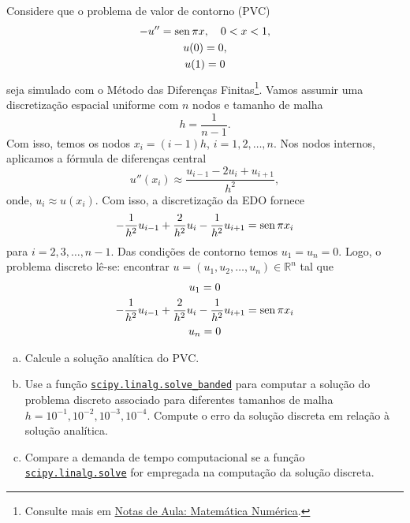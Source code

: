 \begin{exer}\label{exer:pvc1d}
  Considere que o problema de valor de contorno (PVC)
  \begin{gather}
    -u'' = \operatorname{sen} \pi x,\quad 0 < x < 1,\\
    u(0) = 0,\\
    u(1) = 0
  \end{gather}
  seja simulado com o Método das Diferenças Finitas\footnote{Consulte mais em \href{https://phkonzen.github.io/notas/MatematicaNumerica/cap_pvc_sec_mdf.html}{Notas de Aula: Matemática Numérica}.}. Vamos assumir uma discretização espacial uniforme com $n$ nodos e tamanho de malha
  \begin{equation}
    h = \frac{1}{n-1}.
  \end{equation}
  Com isso, temos os nodos $x_i = (i-1)h$, $i=1,2,\dotsc,n$. Nos nodos internos, aplicamos a fórmula de diferenças central
  \begin{equation}
    u''(x_i) \approx \frac{u_{i-1} - 2u_i + u_{i+1}}{h^2},
  \end{equation}
  onde, $u_i \approx u(x_i)$. Com isso, a discretização da EDO fornece
  \begin{equation}
    -\frac{1}{h^2}u_{i-1} + \frac{2}{h^2}u_i - \frac{1}{h^2}u_{i+1} = \operatorname{sen} \pi x_i
  \end{equation}
  para $i=2,3,\dotsc,n-1$. Das condições de contorno temos $u_1 = u_n = 0$. Logo, o problema discreto lê-se: encontrar $u = (u_1,u_2,\dotsc,u_n)\in \mathbb{R}^n$ tal que
  \begin{gather}
    u_1 = 0\\
    -\frac{1}{h^2}u_{i-1} + \frac{2}{h^2}u_i - \frac{1}{h^2}u_{i+1} = \operatorname{sen} \pi x_i\\
    u_n = 0
  \end{gather}
  \begin{enumerate}[a)]
  \item Calcule a solução analítica do PVC.
  \item Use a função \href{https://docs.scipy.org/doc/scipy/reference/generated/scipy.linalg.solve_banded.html}{\lstinline+scipy.linalg.solve_banded+} para computar a solução do problema discreto associado para diferentes tamanhos de malha $h = 10^{-1}, 10^{-2}, 10^{-3}, 10^{-4}$. Compute o erro da solução discreta em relação à solução analítica.
  \item Compare a demanda de tempo computacional se a função \href{https://docs.scipy.org/doc/scipy/reference/generated/scipy.linalg.solve.html}{\lstinline+scipy.linalg.solve+} for empregada na computação da solução discreta.
  \end{enumerate}
\end{exer}

